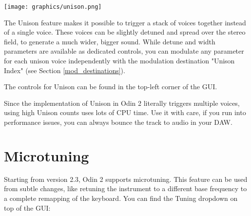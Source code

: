 \begin{center}
    \texttt{[image: graphics/unison.png]}
\end{center}

The Unison feature makes it possible to trigger a stack of voices together instead of a single voice. These voices can be slightly detuned and spread over the stereo field, to generate a much wider, bigger sound. While detune and width parameters are available as dedicated controls, you can modulate any parameter for each unison voice independently with the modulation destination "Unison Index" (see Section \ref{mod_destinations}).

\vspace{3mm}
The controls for Unison can be found in the top-left corner of the GUI.

\vspace{3mm}
\begin{tcolorbox}[colback=yellow!10!white,
        colframe=white!20!black,
        center,
        valign=top,
        halign=left,
        center title,
        width=\textwidth]

    Since the implementation of Unison in Odin 2 literally triggers multiple voices, using high Unison counts uses lots of CPU time. Use it with care, if you run into performance issues, you can always bounce the track to audio in your DAW.
\end{tcolorbox}




\section{Microtuning}
\label{microtuning}

Starting from version 2.3, Odin 2 supports microtuning. This feature can be used from subtle changes, like retuning the instrument to a different base frequency to a complete remapping of the keyboard.
You can find the Tuning dropdown on top of the GUI:

